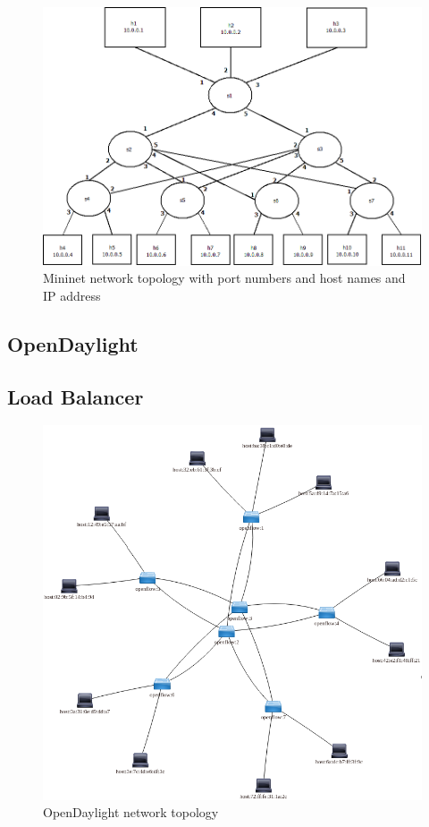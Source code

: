 \begin{figure}[h!]
 \centering
 \includegraphics[width=\linewidth]{images/mnnetwork.png}
 \caption{Mininet network topology with port numbers and host names and IP address}
 \label{fig:mnnetwork}
\end{figure}



\subsection{OpenDaylight}

\subsection{Load Balancer}

\begin{figure}[h!]
 \centering
 \includegraphics[width=\linewidth]{images/odltopo.png}
 \caption{OpenDaylight network topology}
 \label{fig:odltopo}
\end{figure}
